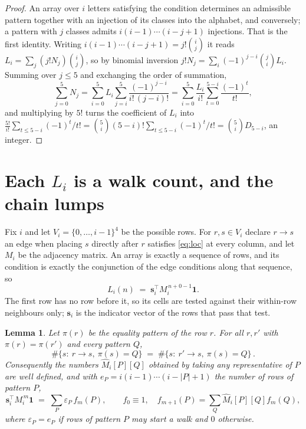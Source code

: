 \documentclass[11pt,a4paper]{article}
\theoremstyle{plain}
\newtheorem{lemma}[theorem]{Lemma}
\theoremstyle{definition}
\begin{document}
\begin{proof}
An array over $i$ letters satisfying the condition determines an admissible pattern together
with an injection of its classes into the alphabet, and conversely; a pattern with $j$
classes admits $i(i-1)\cdots(i-j+1)$ injections. That is the first identity. Writing
$i(i-1)\cdots(i-j+1)=j!\binom{i}{j}$ it reads $L_i=\sum_j (j!N_j)\binom{i}{j}$, so by
binomial inversion $j!N_j=\sum_{i}(-1)^{j-i}\binom{j}{i}L_i$. Summing over
$j\le 5$ and exchanging the order of summation,
\[
\sum_{j=0}^{5}N_j=\sum_{i=0}^{5}L_i\sum_{j=i}^{5}\frac{(-1)^{j-i}}{i!\,(j-i)!}
=\sum_{i=0}^{5}\frac{L_i}{i!}\sum_{t=0}^{5-i}\frac{(-1)^t}{t!} ,
\]
and multiplying by $5!$ turns the coefficient of $L_i$ into
$\frac{5!}{i!}\sum_{t\le 5-i}(-1)^t/t!=\binom{5}{i}(5-i)!\sum_{t\le 5-i}(-1)^t/t!
=\binom{5}{i}D_{5-i}$, an integer.
\end{proof}

\section{Each $L_i$ is a walk count, and the chain lumps}

Fix $i$ and let $V_i=\{0,\dots,i-1\}^{4}$ be the possible rows. For $r,s\in V_i$
declare $r\to s$ an edge when placing $s$ directly after $r$ satisfies \eqref{eq:loc} at
every column, and let $M_i$ be the adjacency matrix. An array is exactly a sequence of
rows, and its condition is exactly the conjunction of the edge conditions along that
sequence, so
\[
L_i(n)\;=\;\mathbf{s}_i^{\!\top}M_i^{\,n+0-1}\mathbf{1} .
\]
The first row has no row before it, so its cells are tested
against their within-row neighbours only; $\mathbf{s}_i$ is the indicator vector of the
rows that pass that test.

\begin{lemma}\label{lem:lump}
Let $\pi(r)$ be the equality pattern of the row $r$. For all $r,r'$ with
$\pi(r)=\pi(r')$ and every pattern $Q$,
\[
\#\{s:\ r\to s,\ \pi(s)=Q\}\;=\;\#\{s:\ r'\to s,\ \pi(s)=Q\}\, .
\]
Consequently the numbers $\widehat M_i[P][Q]$ obtained by taking any representative of $P$
are well defined, and with $e_P=i(i-1)\cdots(i-|P|+1)$ the number of rows of pattern $P$,
\[
\mathbf{s}_i^{\!\top}M_i^{\,m}\mathbf{1}\;=\;\sum_P \varepsilon_P\,f_m(P),
\qquad f_0\equiv1,\quad f_{m+1}(P)=\sum_Q\widehat M_i[P][Q]f_m(Q),
\]
where $\varepsilon_P=e_P$ if rows of pattern $P$ may start a walk and $0$ otherwise.
\end{lemma}
\end{document}

